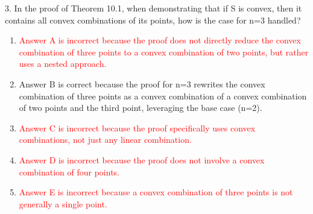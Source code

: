 \documentclass{article}%
\newcommand{\incorrect}[1]{\textcolor{red}{#1}}
\begin{document}
\vspace{1em}%
3. In the proof of Theorem 10.1, when demonstrating that if S is convex, then it contains all convex combinations of its points, how is the case for n=3 handled?%
\begin{enumerate}[label=\Alph*.]%
\item \incorrect{Answer A is incorrect because the proof does not directly reduce the convex combination of three points to a convex combination of two points, but rather uses a nested approach.}%
\item Answer B is correct because the proof for n=3 rewrites the convex combination of three points as a convex combination of a convex combination of two points and the third point, leveraging the base case (n=2).%
\item \incorrect{Answer C is incorrect because the proof specifically uses convex combinations, not just any linear combination.}%
\item \incorrect{Answer D is incorrect because the proof does not involve a convex combination of four points.}%
\item \incorrect{Answer E is incorrect because a convex combination of three points is not generally a single point.}%
\end{enumerate}%
\vspace{1em}

%
\end{document}
